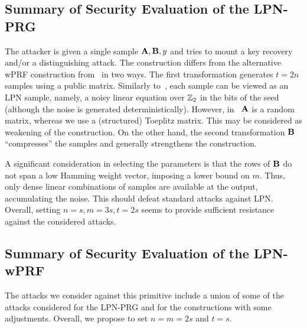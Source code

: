 \subsection{Summary of Security Evaluation of the LPN-PRG}
The attacker is given a single sample $\mat{A},\mat{B},y$ and tries to mount a key recovery and/or a distinguishing attack. The construction differs from the alternative wPRF construction from~\cite{boneh2018-darkmatter} in two ways. The first transformation generates $t = 2n$ samples using a public matrix. Similarly to~\cite{boneh2018-darkmatter}, each sample can be viewed as an LPN sample, namely, a noisy linear equation over $\mathbb{Z}_2$ in the bits of the seed (although the noise is generated deterministically). However, in~\cite{boneh2018-darkmatter} $\mat{A}$ is a random matrix, whereas we use a (structured) Toeplitz matrix. This may be considered as weakening of the construction. On the other hand, the second transformation $\mat{B}$ ``compresses'' the samples and generally strengthens the construction.

A significant consideration in selecting the parameters is that the rows of $\mat{B}$ do not span a low Hamming weight vector, imposing a lower bound on $m$. Thus, only dense linear combinations of samples are available at the output, accumulating the noise. This should defeat standard attacks against LPN. Overall, setting $n=s, m = 3s, t = 2s$ seems to provide sufficient resistance against the considered attacks.

\subsection{Summary of Security Evaluation of the LPN-wPRF}
The attacks we consider against this primitive include a union of some of the attacks considered for the LPN-PRG and for the \ttwPRF constructions with some adjustments. Overall, we propose to set $n=m= 2s$ and $t =s$.
